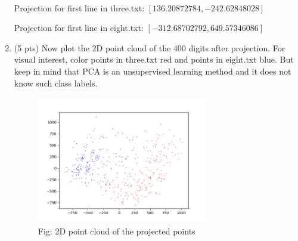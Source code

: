 \documentclass[a4paper]{article}
\theoremstyle{definition}
\newenvironment{soln}{
    \leavevmode\color{blue}\ignorespaces
}{}
\begin{document}
\begin{enumerate}
\begin{soln}\\
Projection for first line in three.txt:
$[ 136.20872784, -242.62848028]$

Projection for first line in eight.txt:
$[-312.68702792,   649.57346086]$
\end{soln}




\item (5 pts) Now plot the 2D point cloud of the 400 digits after projection.
For visual interest, color points in three.txt red and points in eight.txt blue.
But keep in mind that PCA is an unsupervised learning method and it does not know such class labels.

\begin{soln} 

\begin{figure}[H]
	        \centering
	        \includegraphics[width=0.7\textwidth]{Q6_YKWV.png}
	        \captionsetup{labelformat=empty}
	        \caption{Fig: 2D point cloud of the projected points}
	        \label{fig:2D point cloud of the projected points}
\end{figure}
\end{soln}

\end{enumerate}
\end{document}
